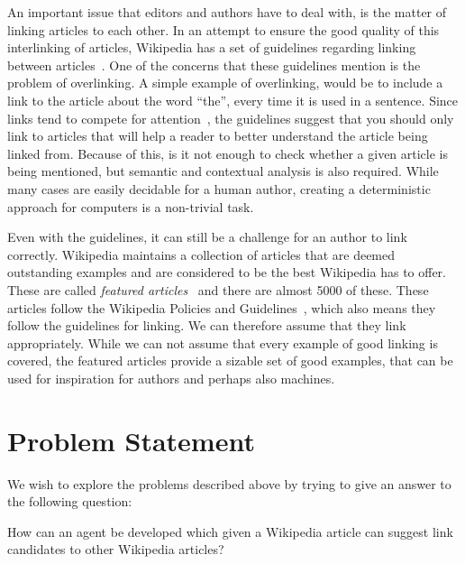 An important issue that editors and authors have to deal with, is the matter of linking articles to each other. In an attempt to ensure the good quality of this interlinking of articles, Wikipedia has a set of guidelines regarding linking between articles~\cite{wiki-manual-of-style-overlinking}. 
One of the concerns that these guidelines mention is the problem of overlinking. A simple example of overlinking, would be to include a link to the article about the word \enquote{the}, every time it is used in a sentence. Since links tend to compete for attention~\cite{hyperlink-structure-using-logs}, the guidelines suggest that you should only link to articles that will help a reader to better understand the article being linked from. Because of this, is it not enough to check whether a given article is being mentioned, but semantic and contextual analysis is also required. While many cases are easily decidable for a human author, creating a deterministic approach for computers is a non-trivial task.

Even with the guidelines, it can still be a challenge for an author to link correctly. Wikipedia maintains a collection of articles that are deemed outstanding examples and are considered to be the best Wikipedia has to offer. These are called \emph{featured articles}~\cite{wiki-featured-articles} and there are almost 5000 of these. These articles follow the Wikipedia Policies and Guidelines~\cite{wiki-editor-guidelines}, which also means they follow the guidelines for linking. We can therefore assume that they link appropriately. While we can not assume that every example of good linking is covered, the featured articles provide a sizable set of good examples, that can be used for inspiration for authors and perhaps also machines.

\section{Problem Statement}
\label{sec:problem_statement}
We wish to explore the problems described above by trying to give an answer to the following question:

\begin{formal}
How can an agent be developed which given a Wikipedia article can suggest link candidates to other Wikipedia articles?
\end{formal}

